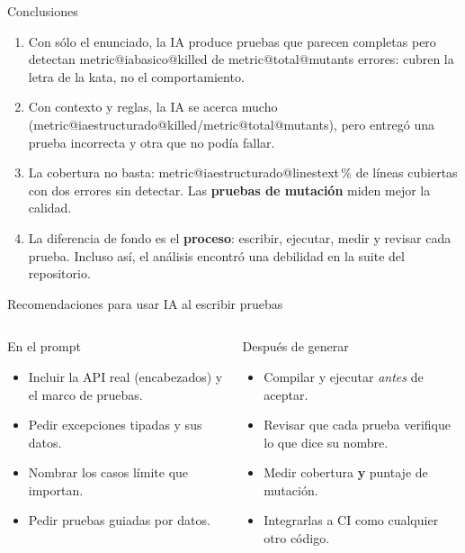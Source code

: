 \documentclass[aspectratio=169,10pt]{beamer}
\makeatletter
\newcommand{\metric}[2]{\csname metric@#1@#2\endcsname}
\makeatother
\begin{document}
\begin{frame}{Conclusiones}
  \begin{enumerate}
    \item Con sólo el enunciado, la IA produce pruebas que \alert{parecen completas} pero detectan
      \metric{iabasico}{killed} de \metric{total}{mutants} errores: cubren la letra de la kata, no el
      comportamiento.
    \item Con contexto y reglas, la IA se acerca mucho
      (\metric{iaestructurado}{killed}/\metric{total}{mutants}), pero entregó \alert{una prueba incorrecta}
      y otra que no podía fallar.
    \item La cobertura no basta: \metric{iaestructurado}{linestext}\,\% de líneas cubiertas con dos errores sin
      detectar. Las \textbf{pruebas de mutación} miden mejor la calidad.
    \item La diferencia de fondo es el \textbf{proceso}: escribir, ejecutar, medir y revisar cada prueba.
      Incluso así, el análisis encontró una debilidad en la suite del repositorio.
  \end{enumerate}
\end{frame}

\begin{frame}{Recomendaciones para usar IA al escribir pruebas}
  \begin{columns}[T,onlytextwidth]
    \begin{block}{En el prompt}
      \small
      \begin{itemize}
        \item Incluir la API real (encabezados) y el marco de pruebas.
        \item Pedir excepciones tipadas y sus datos.
        \item Nombrar los casos límite que importan.
        \item Pedir pruebas guiadas por datos.
      \end{itemize}
    \end{block}
    \begin{block}{Después de generar}
      \small
      \begin{itemize}
        \item Compilar y ejecutar \emph{antes} de aceptar.
        \item Revisar que cada prueba verifique lo que dice su nombre.
        \item Medir cobertura \textbf{y} puntaje de mutación.
        \item Integrarlas a CI como cualquier otro código.
      \end{itemize}
    \end{block}
  \end{columns}
\end{frame}
\end{document}
